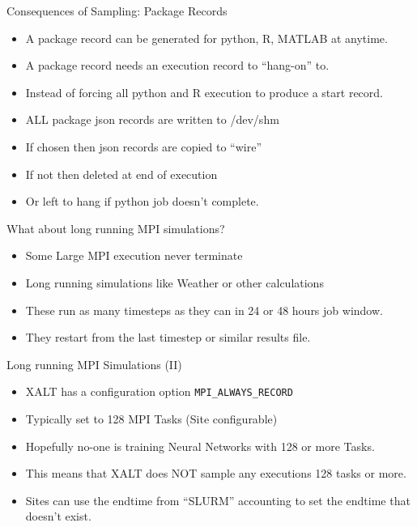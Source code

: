 \documentclass{beamer}
\begin{document}
\begin{frame}{Consequences of Sampling: Package Records}
  \begin{itemize}
    \item A package record can be generated for python, R, MATLAB at
      anytime.
    \item A package record needs an execution record to ``hang-on''
      to.
    \item Instead of forcing all python and R execution to produce a
      start record.
    \item ALL package json records are written to /dev/shm
    \item If chosen then json records are copied to ``wire''
    \item If not then deleted at end of execution 
    \item Or left to hang if python job doesn't complete.
  \end{itemize}
\end{frame}

\begin{frame}{What about long running MPI simulations?}
  \begin{itemize}
    \item Some Large MPI execution never terminate
    \item Long running simulations like Weather or other calculations 
    \item These run as many timesteps as they can in 24 or 48 hours
      job window.
    \item They restart from the last timestep or similar results file.
  \end{itemize}
\end{frame}

\begin{frame}{Long running MPI Simulations (II)}
  \begin{itemize}
    \item XALT has a configuration option \texttt{MPI\_ALWAYS\_RECORD} 
    \item Typically set to 128 MPI Tasks (Site configurable)
    \item Hopefully no-one is training Neural Networks with 128 or
      more Tasks.
    \item This means that XALT does NOT sample any executions 128
      tasks or more.
    \item Sites can use the endtime from ``SLURM'' accounting to set
      the endtime that doesn't exist. 
  \end{itemize}
\end{frame}
\end{document}
